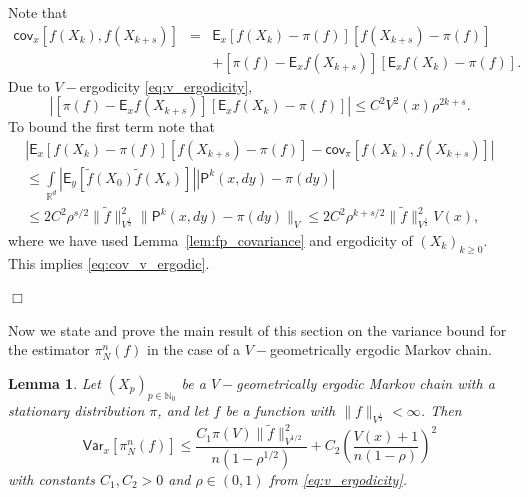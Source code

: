 \documentclass[bj]{imsart}
\def\P{\mathsf{P}}
\def\PE{\mathsf{E}}
\def\PVar{\mathsf{Var}}
\def\PCov{\mathsf{cov}}
\def\nset{\mathbb{N}}
\def\rset{\mathbb{R}}
\def\rset{\mathbb{R}}
\newcommand{\proofendsign}{$\Box$}
\newtheorem{lem}[thm]{Lemma}
\newenvironment{proof}{{\noindent \bf Proof }}
 {{\hspace*{\fill}\proofendsign\par\bigskip}}
\begin{document}
\begin{proof}
Note that
\begin{eqnarray*}
\PCov_x \left[f(X_k),f(X_{k+s})\right] &=& \PE_x\left[f(X_k) - \pi(f)\right]\left[f(X_{k+s})-\pi(f)\right] 
\\
&&+ \left[\pi(f) - \PE_xf(X_{k+s})\right]\left[\PE_xf(X_k) - \pi(f)\right].
\end{eqnarray*}
Due to $V-$ergodicity \eqref{eq:v_ergodicity},
\[
\left|\left[\pi(f) - \PE_xf(X_{k+s})\right]\left[\PE_xf(X_k) - \pi(f)\right]\right| \leq C^2V^2(x)\rho^{2k+s}.
\]
To bound the first term note that
\begin{multline*}
\left|\PE_x\left[f(X_k) - \pi(f)\right]\left[f(X_{k+s})-\pi(f)\right] - \PCov_{\pi}\left[f(X_k),f(X_{k+s})\right]\right|
\\
\leq \int\limits_{\rset^d}\left|\PE_y\left[\tilde{f}(X_0)\tilde{f}(X_{s})\right]\right| |\P^k(x,dy)-\pi(dy)|
\\
\leq 2C^2\rho^{s/2}\|\tilde{f}\|^2_{V^{\frac{1}{2}}}\|\P^k(x,dy)-\pi(dy)\|_{V}
\leq 2C^2\rho^{k+s/2}\|\tilde{f}\|^2_{V^{\frac{1}{2}}}V(x),
\end{multline*}
where we have used Lemma~\ref{lem:fp_covariance} and ergodicity of $(X_k)_{k\geq 0}.$ This implies \eqref{eq:cov_v_ergodic}.
\end{proof}
Now we state and prove the main result of this section on the variance bound for the estimator $\pi_N^n(f)$ in the case of a $V-$geometrically ergodic Markov chain.
\begin{lem}
\label{lem:var_bound}
Let $(X_p)_{p \in \nset_0}$ be a $V-$geometrically ergodic Markov chain with a stationary distribution $\pi$, and let $f$ be a function with $\|f\|_{V^{\frac{1}{2}}} < \infty$.  Then
\begin{equation}
\label{eq:vanilla_var}
\PVar_x \left[ \pi_{N}^n(f) \right] \leq \frac{C_1\pi(V)\|\tilde{f}\|^2_{V^{1/2}}}{n(1-\rho^{1/2})} + C_2\left(\frac{V(x) + 1}{n(1-\rho)}\right)^2
\end{equation}
with constants $C_1,C_2 > 0$ and $\rho\in (0,1)$ from \eqref{eq:v_ergodicity}.
\end{lem}
\end{document}
